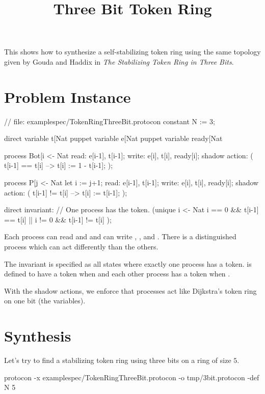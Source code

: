 
\title{Three Bit Token Ring}
\date{}



This shows how to synthesize a self-stabilizing token ring using the same topology given by 
Gouda and Haddix in \textit{The Stabilizing Token Ring in Three Bits}.

\section{Problem Instance}

\begin{code}
// file: examplespec/TokenRingThreeBit.protocon
constant N := 3;

direct variable t[Nat %
puppet variable e[Nat %
puppet variable ready[Nat %

process Bot[i <- Nat %
{
  read:  e[i-1], t[i-1];
  write: e[i], t[i], ready[i];
  shadow action: ( t[i-1] == t[i] --> t[i] := 1 - t[i-1]; );
}

process P[j <- Nat %
{
  let i := j+1;
  read:  e[i-1], t[i-1];
  write: e[i], t[i], ready[i];
  shadow action: ( t[i-1] != t[i] --> t[i] := t[i-1]; );
}

direct invariant:
  // One process has the token.
  (unique i <- Nat %
   i == 0 && t[i-1] == t[i]
   ||
   i != 0 && t[i-1] != t[i]
  );
\end{code}

Each process can read  and  and can write , , and .
There is a distinguished process  which can act differently than the others.

The invariant is specified as all states where exactly one process has a token.
 is defined to have a token when  and each other  process has a token when .

With the shadow actions, we enforce that processes act like Dijkstra's token ring on one bit (the  variables).

\section{Synthesis}

Let's try to find a stabilizing token ring using three bits on a ring of size $5$.
\begin{code}
protocon -x examplespec/TokenRingThreeBit.protocon -o tmp/3bit.protocon -def N 5
\end{code}

